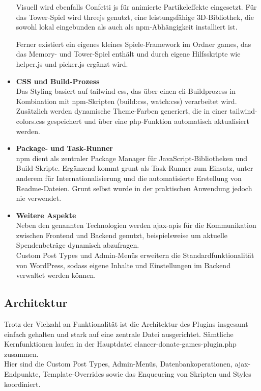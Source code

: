 \begin{itemize}
    Visuell wird ebenfalls Confetti \gls{js} für animierte Partikeleffekte eingesetzt.
    Für das Tower-Spiel wird \gls{threejs} genutzt, eine leistungsfähige 3D-Bibliothek, die sowohl lokal eingebunden als auch als \gls{npm}-Abhängigkeit installiert ist.

    Ferner existiert ein eigenes kleines Spiele-Framework im Ordner \grqq{}games\grqq{}, das das Memory- und Tower-Spiel enthält und durch eigene Hilfsskripte wie helper.js und picker.js ergänzt wird.

    \item \textbf{CSS und Build-Prozess}\\
    Das Styling basiert auf \gls{tailwind} \gls{css}, das über einen \gls{cli}-Buildprozess in Kombination mit \gls{npm}-Skripten (build:css, watch:css) verarbeitet wird.
    Zusätzlich werden dynamische Theme-Farben generiert, die in einer tailwind-colors.css gespeichert und über eine \gls{php}-Funktion automatisch aktualisiert werden.

    \item \textbf{Package- und Task-Runner}\\
    \gls{npm} dient als zentraler Package Manager für JavaScript-Bibliotheken und Build-Skripte.
    Ergänzend kommt \gls{grunt} als Task-Runner zum Einsatz, unter anderem für Internationalisierung und die automatisierte Erstellung von Readme-Dateien.
    Grunt selbst wurde in der praktischen Anwendung jedoch nie verwendet.

    \item \textbf{Weitere Aspekte}\\
    Neben den genannten Technologien werden \gls{ajax}-\gls{api}s für die Kommunikation zwischen Frontend und Backend genutzt, beispielsweise um aktuelle Spendenbeträge dynamisch abzufragen.\\
    Custom Post Types und Admin-Menüs erweitern die Standardfunktionalität von WordPress, sodass eigene Inhalte und Einstellungen im Backend verwaltet werden können.
\end{itemize}
\subsection{Architektur}

Trotz der Vielzahl an Funktionalität ist die Architektur des Plugins insgesamt einfach gehalten und stark auf eine zentrale Datei ausgerichtet.
Sämtliche Kernfunktionen laufen in der Hauptdatei elancer-donate-games-plugin.php zusammen.\\
Hier sind die Custom Post Types, Admin-Menüs, Datenbankoperationen, \gls{ajax}-Endpunkte, Template-Overrides sowie das Enqueueing von Skripten und Styles koordiniert.

